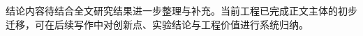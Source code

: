 ﻿\begin{conclusions}
结论内容待结合全文研究结果进一步整理与补充。当前工程已完成正文主体的初步迁移，可在后续写作中对创新点、实验结论与工程价值进行系统归纳。
\end{conclusions}
